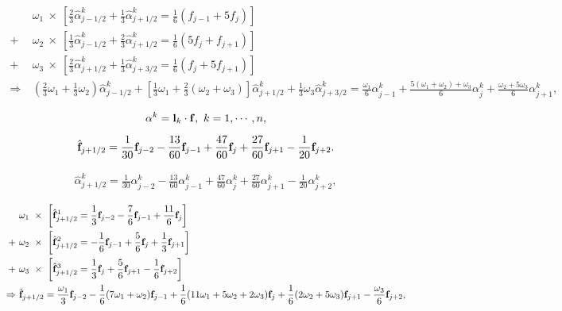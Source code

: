 \documentclass{article}
\begin{document}
\begin{align} &\ \omega_1\ \times\ \left[ \frac{2}{3}\hat{\alpha}^k_{j-1/2} + \frac{1}{3}\hat{\alpha}^k_{j+1/2} = \frac{1}{6} \left( f_{j-1} + 5f_j \right) \right]\\ + &\ \omega_2\ \times\ \left[ \frac{1}{3}\hat{\alpha}^k_{j-1/2}+\frac{2}{3}\hat{\alpha}^k_{j+1/2} = \frac{1}{6} \left( 5f_j + f_{j+1} \right) \right] \\ + &\ \omega_3\ \times\ \left[ \frac{2}{3}\hat{\alpha}^k_{j+1/2} + \frac{1}{3}\hat{\alpha}^k_{j+3/2} = \frac{1}{6} \left( f_j + 5f_{j+1} \right) \right] \\ \Rightarrow &\ \left(\frac{2}{3}\omega_1+\frac{1}{3}\omega_2\right)\hat{\alpha}^k_{j-1/2} + \left[\frac{1}{3}\omega_1+\frac{2}{3}(\omega_2+\omega_3)\right]\hat{\alpha}^k_{j+1/2} + \frac{1}{3}\omega_3\hat{\alpha}^k_{j+3/2} = \frac{\omega_1}{6}{\alpha}^k_{j-1} + \frac{5(\omega_1+\omega_2)+\omega_3}{6}{\alpha}^k_j + \frac{\omega_2+5\omega_3}{6}{\alpha}^k_{j+1}, \end{align}
\pagebreak

\begin{equation} \alpha^k = {\bf l}_k \cdot {\bf f},\ k=1,\cdots,n, \end{equation}
\pagebreak

\begin{align} \hat{\bf f}_{j+1/2} = \frac{1}{30} {\bf f}_{j-2} - \frac{13}{60}{\bf f}_{j-1} + \frac{47}{60}{\bf f}_j + \frac{27}{60}{\bf f}_{j+1} - \frac{1}{20}{\bf f}_{j+2}. \end{align}
\pagebreak

\begin{align} \hat{\alpha}^k_{j+1/2} = \frac{1}{30} {\alpha}^k_{j-2} - \frac{13}{60}{\alpha}^k_{j-1} + \frac{47}{60}{\alpha}^k_j + \frac{27}{60}{\alpha}^k_{j+1} - \frac{1}{20}{\alpha}^k_{j+2}, \end{align}
\pagebreak

\begin{align} &\ \omega_1\ \times\ \left[ \hat{\bf f}_{j+1/2}^1 = \frac{1}{3} {\bf f}_{j-2} - \frac{7}{6} {\bf f}_{j-1} + \frac{11}{6} {\bf f}_j \right]\\ + &\ \omega_2\ \times\ \left[ \hat{\bf f}_{j+1/2}^2 = -\frac{1}{6} {\bf f}_{j-1} + \frac{5}{6} {\bf f}_j + \frac{1}{3} {\bf f}_{j+1} \right]\\ + &\ \omega_3\ \times\ \left[ \hat{\bf f}_{j+1/2}^3 = \frac{1}{3} {\bf f}_j + \frac{5}{6} {\bf f}_{j+1} - \frac{1}{6} {\bf f}_{j+2} \right]\\ \Rightarrow &\ \hat{\bf f}_{j+1/2} = \frac{\omega_1}{3} {\bf f}_{j-2} - \frac{1}{6}(7\omega_1+\omega_2){\bf f}_{j-1} + \frac{1}{6}(11\omega_1+5\omega_2+2\omega_3){\bf f}_j + \frac{1}{6}(2\omega_2+5\omega_3){\bf f}_{j+1} - \frac{\omega_3}{6}{\bf f}_{j+2}, \end{align}
\pagebreak
\end{document}
